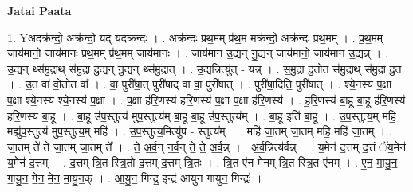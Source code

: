 \documentclass[17pt]{extarticle}
\begin{document}
\textbf{Jatai Paata} \newline

1. Yअदक्र॑न्दो॒ अक्र॑न्दो॒ यद् यदक्र॑न्दः । . अक्र॑न्दः प्रथ॒मम् प्र॑थ॒म मक्र॑न्दो॒ अक्र॑न्दः प्रथ॒मम् । . प्र॒थ॒मम् जाय॑मानो॒ जाय॑मानः प्रथ॒मम् प्र॑थ॒मम् जाय॑मानः । . जाय॑मान उ॒द्यन् नु॒द्यन् जाय॑मानो॒ जाय॑मान उ॒द्यन्न् । . उ॒द्यन् थ्स॑मु॒द्राथ् स॑मु॒द्रा दु॒द्यन् नु॒द्यन् थ्स॑मु॒द्रात् । . उ॒द्यन्नित्यु॑त् - यन्न् । . स॒मु॒द्रा दु॒तोत स॑मु॒द्राथ् स॑मु॒द्रा दु॒त । . उ॒त वा॑ वो॒तोत वा᳚ । . वा॒ पुरी॑षा॒त् पुरी॑षाद् वा वा॒ पुरी॑षात् । . पुरी॑षा॒दिति॒ पुरी॑षात् । . श्ये॒नस्य॑ प॒क्षा प॒क्षा श्ये॒नस्य॑ श्ये॒नस्य॑ प॒क्षा । . प॒क्षा ह॑रि॒णस्य॑ हरि॒णस्य॑ प॒क्षा प॒क्षा ह॑रि॒णस्य॑ । . ह॒रि॒णस्य॑ बा॒हू बा॒हू ह॑रि॒णस्य॑ हरि॒णस्य॑ बा॒हू । . बा॒हू उ॑प॒स्तुत्य॑ मुप॒स्तुत्य॑म् बा॒हू बा॒हू उ॑प॒स्तुत्य᳚म् । . बा॒हू इति॑ बा॒हू । . उ॒प॒स्तुत्य॒म् महि॒ मह्यु॑प॒स्तुत्य॑ मुप॒स्तुत्य॒म् महि॑ । . उ॒प॒स्तुत्य॒मित्यु॑प - स्तुत्य᳚म् । . महि॑ जा॒तम् जा॒तम् महि॒ महि॑ जा॒तम् । . जा॒तम् ते॑ ते जा॒तम् जा॒तम् ते᳚ । . ते॒ अ॒र्व॒न् न॒र्व॒न् ते॒ ते॒ अ॒र्व॒न्न् । . अ॒र्व॒न्नित्य॑र्वन्न् । . य॒मेन॑ द॒त्तम् द॒त्तं ॅय॒मेन॑ य॒मेन॑ द॒त्तम् । . द॒त्तम् त्रि॒त स्त्रि॒तो द॒त्तम् द॒त्तम् त्रि॒तः । . त्रि॒त ए॑न मेनम् त्रि॒त स्त्रि॒त ए॑नम् । . ए॒न॒ मा॒यु॒न॒ गा॒यु॒न॒ गे॒न॒ मे॒न॒ मा॒यु॒न॒क् । . आ॒यु॒न॒ गिन्द्र॒ इन्द्र॑ आयुन गायुन॒ गिन्द्रः॑ । \newline
\end{document}
